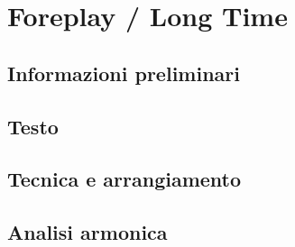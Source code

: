 \documentclass[class=book, crop=false, oneside, 12pt]{standalone}
\begin{document}
\chapter{Foreplay / Long Time}

\section{Informazioni preliminari}
\section{Testo}
\section{Tecnica e arrangiamento}
\section{Analisi armonica}
\end{document}
